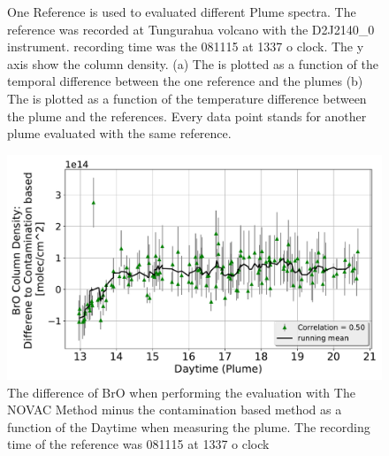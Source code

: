\documentclass  [
  paper    = a4,
  BCOR     = 10mm,
  twoside,
  fontsize = 12pt,
  fleqn,
  toc      = bibnumbered,
  toc      = listofnumbered,
  numbers  = noendperiod,
  headings = normal,
  listof   = leveldown,
  version  = 3.03
]                                       {scrreprt}
\begin{document}
	\begin{figure}
		\caption{One Reference is used to evaluated different Plume spectra. The reference was recorded at Tungurahua volcano with the D2J2140\_0 instrument. recording time was the 081115 at 1337 o clock. The y axis show the   column density. (a) The   is plotted as a function of the temporal difference between the one reference and the plumes  (b) The   is plotted as a function of the temperature difference between the plume and the references. Every data point stands for another plume evaluated with the same reference.}
		\label{fig:onerefd2j2140060218difftemperature-cbro}
	\end{figure}
	\begin{figure}
		\includegraphics[width=0.7\linewidth]{"Bilder/OneRefMorePlumes_refdate_081115_1337/onerefD2J2140_0_6_02_18_DiffDaytime (Plume)_BrO"}
		\caption{The difference of BrO when performing the evaluation with The NOVAC Method minus the contamination based method as a function of the Daytime when measuring the plume. The recording time of the reference was 081115 at 1337 o clock}
		\end{figure}
\end{document}

